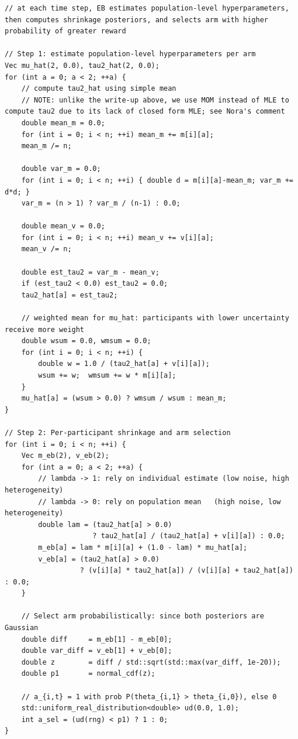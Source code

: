 \documentclass[letterpaper, 9pt]{extarticle}
\begin{document}
\begin{lstlisting}[caption={EB Action Selection Strategy}, label={lst:eb_actionsel}]
// at each time step, EB estimates population-level hyperparameters, then computes shrinkage posteriors, and selects arm with higher probability of greater reward

// Step 1: estimate population-level hyperparameters per arm
Vec mu_hat(2, 0.0), tau2_hat(2, 0.0);
for (int a = 0; a < 2; ++a) {
    // compute tau2_hat using simple mean
    // NOTE: unlike the write-up above, we use MOM instead of MLE to compute tau2 due to its lack of closed form MLE; see Nora's comment
    double mean_m = 0.0;
    for (int i = 0; i < n; ++i) mean_m += m[i][a];
    mean_m /= n;

    double var_m = 0.0;
    for (int i = 0; i < n; ++i) { double d = m[i][a]-mean_m; var_m += d*d; }
    var_m = (n > 1) ? var_m / (n-1) : 0.0;

    double mean_v = 0.0;
    for (int i = 0; i < n; ++i) mean_v += v[i][a];
    mean_v /= n;

    double est_tau2 = var_m - mean_v;
    if (est_tau2 < 0.0) est_tau2 = 0.0;
    tau2_hat[a] = est_tau2;

    // weighted mean for mu_hat: participants with lower uncertainty receive more weight
    double wsum = 0.0, wmsum = 0.0;
    for (int i = 0; i < n; ++i) {
        double w = 1.0 / (tau2_hat[a] + v[i][a]);
        wsum += w;  wmsum += w * m[i][a];
    }
    mu_hat[a] = (wsum > 0.0) ? wmsum / wsum : mean_m;
}

// Step 2: Per-participant shrinkage and arm selection
for (int i = 0; i < n; ++i) {
    Vec m_eb(2), v_eb(2);
    for (int a = 0; a < 2; ++a) {
        // lambda -> 1: rely on individual estimate (low noise, high heterogeneity)
        // lambda -> 0: rely on population mean   (high noise, low heterogeneity)
        double lam = (tau2_hat[a] > 0.0)
                     ? tau2_hat[a] / (tau2_hat[a] + v[i][a]) : 0.0;
        m_eb[a] = lam * m[i][a] + (1.0 - lam) * mu_hat[a];
        v_eb[a] = (tau2_hat[a] > 0.0)
                  ? (v[i][a] * tau2_hat[a]) / (v[i][a] + tau2_hat[a]) : 0.0;
    }

    // Select arm probabilistically: since both posteriors are Gaussian
    double diff     = m_eb[1] - m_eb[0];
    double var_diff = v_eb[1] + v_eb[0];
    double z        = diff / std::sqrt(std::max(var_diff, 1e-20));
    double p1       = normal_cdf(z);

    // a_{i,t} = 1 with prob P(theta_{i,1} > theta_{i,0}), else 0
    std::uniform_real_distribution<double> ud(0.0, 1.0);
    int a_sel = (ud(rng) < p1) ? 1 : 0;
}
\end{lstlisting}
\end{document}
